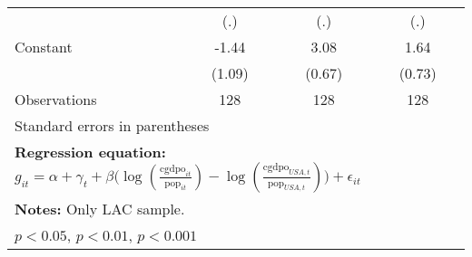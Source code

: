 \begin{table}[htbp]
\begin{tabular}{l*{3}{c}}
                &      (.)         &      (.)         &      (.)         \\
\addlinespace
Constant        &    -1.44         &     3.08\sym{***}&     1.64\sym{*}  \\
                &   (1.09)         &   (0.67)         &   (0.73)         \\
\midrule
Observations    &      128         &      128         &      128         \\
\bottomrule
\multicolumn{4}{l}{\footnotesize Standard errors in parentheses}\\
\multicolumn{4}{l}{\footnotesize \textbf{Regression equation:} \(g_{it} = \alpha + \gamma_t + \beta \big(\log (\frac{\textrm{cgdpo}_{it}}{\textrm{pop}_{it}} ) - \log (\frac{\textrm{cgdpo}_{USA,t}}{\textrm{pop}_{USA,t}}  ) \big) + \epsilon_{it}\)}\\
\multicolumn{4}{l}{\footnotesize \textbf{Notes:} Only LAC sample.}\\
\multicolumn{4}{l}{\footnotesize \sym{*} \(p<0.05\), \sym{**} \(p<0.01\), \sym{***} \(p<0.001\)}\\
\end{tabular}
\end{table}
